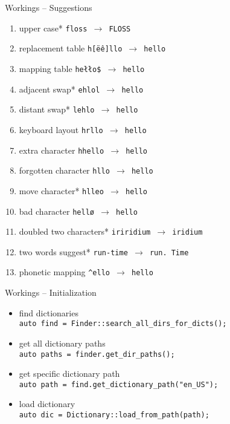 \documentclass{beamer}
\begin{document}
\begin{frame}{Workings – Suggestions}
\begin{enumerate}
\item upper case* \hfill \texttt{\alert{floss} $\rightarrow$ \alert{FLOSS}}
\item replacement table \hfill \texttt{h\alert{[ëê]}llo $\rightarrow$ h\alert{e}llo}
\item mapping table \hfill \texttt{he\alert{łło\$} $\rightarrow$ he\alert{llo}}
\item adjacent swap* \hfill \texttt{\alert{eh}l\alert{ol} $\rightarrow$ \alert{he}l\alert{lo}}
\item distant swap* \hfill \texttt{\alert{l}e\alert{h}lo $\rightarrow$ \alert{h}e\alert{l}lo}
\item keyboard layout \hfill \texttt{h\alert{r}llo $\rightarrow$ h\alert{e}llo}
\item extra character \hfill \texttt{h\alert{h}ello $\rightarrow$ hello}
\item forgotten character \hfill \texttt{hllo $\rightarrow$ h\alert{e}llo}
\item move character* \hfill \texttt{h\alert{l}l\alert{e}o $\rightarrow$ h\alert{e}l\alert{l}o}
\item bad character \hfill \texttt{hell\alert{ø} $\rightarrow$ hell\alert{o}}
\item doubled two characters* \hfill \texttt{\alert{iriri}dium $\rightarrow$ \alert{iri}dium}
\item two words suggest* \hfill \texttt{run\alert{-time} $\rightarrow$ run\alert{. Time}}
\item phonetic mapping \hfill \texttt{\alert{\^{}el}lo $\rightarrow$ \alert{hel}lo}
\end{enumerate}
\end{frame}



\begin{frame}{Workings – Initialization}
\begin{itemize}
\item find dictionaries\\
\texttt{auto find = Finder::\alert{search\_all\_dirs\_for\_dicts}();}
\\\mbox{}
\item get all dictionary paths\\
\texttt{auto paths = finder.\alert{get\_dir\_paths}();}
\\\mbox{}
\item get specific dictionary path\\
\texttt{auto path = find.\alert{get\_dictionary\_path}("en\_US");}
\\\mbox{}
\item load dictionary\\
\texttt{auto dic = Dictionary::\alert{load\_from\_path}(path);}
\end{itemize}
\end{frame}
\end{document}
